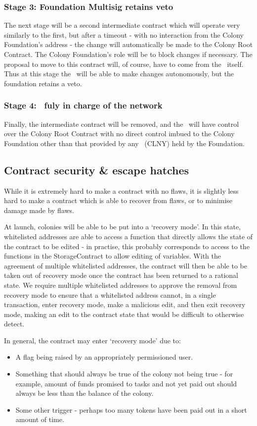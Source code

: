 \subsubsection*{Stage 3: Foundation Multisig retains veto}
The next stage will be a second intermediate contract which will operate very similarly to the first, but after a timeout - with no interaction from the Colony Foundation's address - the change will automatically be made to the Colony Root Contract. The Colony Foundation's role will be to block changes if necessary. The proposal to move to this contract will, of course, have to come from the \rc\ itself.  Thus at this stage the \rc\ will be able to make changes autonomously, but the foundation retains a veto.

\subsubsection*{Stage 4: \rc\ fuly in charge of the network}
Finally, the intermediate contract will be removed, and the \rc\ will have control over the Colony Root Contract with no direct control imbued to the Colony Foundation other than that provided by any \rct\ (CLNY) held by the Foundation. 

\subsection{Contract security \& escape hatches}
While it is extremely hard to make a contract with no flaws, it is slightly less hard to make a contract which is able to recover from flaws, or to minimise damage made by flaws.

At launch, colonies will be able to be put into a `recovery mode'. In this state, whitelisted addresses are able to access a function that directly allows the state of the contract to be edited - in practise, this probably corresponds to access to the functions in the StorageContract to allow editing of variables. With the agreement of multiple whitelisted addresses, the contract will then be able to be taken out of recovery mode once the contract has been returned to a rational state. We require multiple whitelisted addresses to approve the removal from recovery mode to ensure that a whitelisted address cannot, in a single transaction, enter recovery mode, make a malicious edit, and then exit recovery mode, making an edit to the contract state that would be difficult to otherwise detect.

In general, the contract may enter `recovery mode' due to:
\begin{itemize}
 \item A flag being raised by an appropriately permissioned user.
 \item Something that should always be true of the colony not being true - for example, amount of funds promised to tasks and not yet paid out should always be less than the balance of the colony.
 \item Some other trigger - perhaps too many tokens have been paid out in a short amount of time.
\end{itemize}

